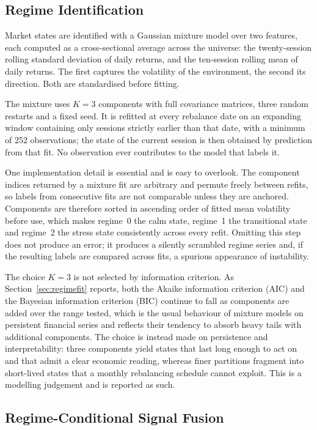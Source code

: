 \documentclass{singlecol-new}
\theoremstyle{TH}{
\newtheorem{lemma}{Lemma}
\newtheorem{theorem}[lemma]{Theorem}
\newtheorem{corrolary}[lemma]{Corrolary}
\newtheorem{conjecture}[lemma]{Conjecture}
\newtheorem{proposition}[lemma]{Proposition}
\newtheorem{claim}[lemma]{Claim}
\newtheorem{stheorem}[lemma]{Wrong Theorem}
\newtheorem{algorithm}{Algorithm}
}
\theoremstyle{THrm}{
\newtheorem{definition}{Definition}[section]
\newtheorem{question}{Question}[section]
\newtheorem{remark}{Remark}
\newtheorem{scheme}{Scheme}
}
\theoremstyle{THhit}{
\newtheorem{case}{Case}[section]
}
\begin{document}
\subsection{Regime Identification}

Market states are identified with a Gaussian mixture model over two features, each
computed as a cross-sectional average across the universe: the twenty-session rolling
standard deviation of daily returns, and the ten-session rolling mean of daily returns.
The first captures the volatility of the environment, the second its direction. Both
are standardised before fitting.

The mixture uses $K = 3$ components with full covariance matrices, three random
restarts and a fixed seed. It is refitted at every rebalance date on an expanding
window containing only sessions strictly earlier than that date, with a minimum of 252
observations; the state of the current session is then obtained by prediction from that
fit. No observation ever contributes to the model that labels it.

One implementation detail is essential and is easy to overlook. The component indices
returned by a mixture fit are arbitrary and permute freely between refits, so labels
from consecutive fits are not comparable unless they are anchored. Components are
therefore sorted in ascending order of fitted mean volatility before use, which makes
regime~0 the calm state, regime~1 the transitional state and regime~2 the stress state
consistently across every refit. Omitting this step does not produce an error; it
produces a silently scrambled regime series and, if the resulting labels are compared
across fits, a spurious appearance of instability.

The choice $K = 3$ is not selected by information criterion. As
Section~\ref{sec:regimefit} reports, both the Akaike information criterion (AIC)
and the Bayesian information criterion (BIC) continue to fall as components are added
over the range tested, which is the usual behaviour of mixture models on
persistent financial series and reflects their tendency to absorb heavy tails with
additional components. The choice is instead made on persistence and interpretability:
three components yield states that last long enough to act on and that admit a clear
economic reading, whereas finer partitions fragment into short-lived states that a
monthly rebalancing schedule cannot exploit. This is a modelling judgement and is
reported as such.

\subsection{Regime-Conditional Signal Fusion}
\end{document}
